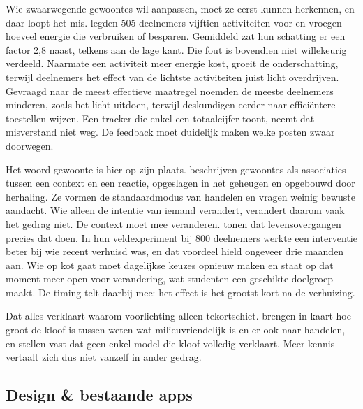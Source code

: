 \documentclass{hogent-article}
\begin{document}
    Wie zwaarwegende gewoontes wil aanpassen, moet ze eerst kunnen herkennen, en
    daar loopt het mis. \textcite{Attari2010} legden 505 deelnemers vijftien
    activiteiten voor en vroegen hoeveel energie die verbruiken of besparen.
    Gemiddeld zat hun schatting er een factor 2,8 naast, telkens aan de lage kant.
    Die fout is bovendien niet willekeurig verdeeld. Naarmate een activiteit meer
    energie kost, groeit de onderschatting, terwijl deelnemers het effect van de
    lichtste activiteiten juist licht overdrijven. Gevraagd naar
    de meest effectieve maatregel noemden de meeste deelnemers minderen, zoals het
    licht uitdoen, terwijl deskundigen eerder naar efficiëntere toestellen wijzen.
    Een tracker die enkel een totaalcijfer toont, neemt dat misverstand niet weg. De
    feedback moet duidelijk maken welke posten zwaar doorwegen.
    
    Het woord gewoonte is hier op zijn plaats. \textcite{WoodRunger2016} beschrijven
    gewoontes als associaties tussen een context en een reactie, opgeslagen in het
    geheugen en opgebouwd door herhaling. Ze vormen de standaardmodus van handelen
    en vragen weinig bewuste aandacht. Wie alleen de intentie van iemand verandert,
    verandert daarom vaak het gedrag niet. De context moet mee veranderen.
    \textcite{VerplankenRoy2016} tonen dat levensovergangen precies dat doen. In hun
    veldexperiment bij 800 deelnemers werkte een interventie beter bij wie recent
    verhuisd was, en dat voordeel hield ongeveer drie maanden aan. Wie op kot gaat
    moet dagelijkse keuzes opnieuw maken en staat op dat moment meer open voor
    verandering, wat studenten een geschikte doelgroep maakt. De timing telt daarbij
    mee: het effect is het grootst kort na de verhuizing.
    
    Dat alles verklaart waarom voorlichting alleen tekortschiet.
    \textcite{KollmussAgyeman2002} brengen in kaart hoe groot de kloof is tussen
    weten wat milieuvriendelijk is en er ook naar handelen, en stellen vast dat geen
    enkel model die kloof volledig verklaart. Meer kennis vertaalt zich dus niet
    vanzelf in ander gedrag.
    
    \subsection{Design \& bestaande apps}
    \label{ssec:designenbestaandeapps}
        
\end{document}

